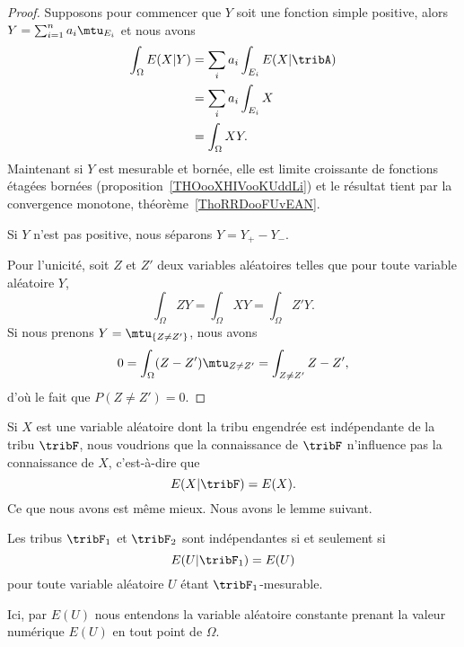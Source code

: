 \begin{proof}
	Supposons pour commencer que \( Y\) soit une fonction simple positive, alors \( Y=\sum_{i=1}^na_i\mtu_{E_i}\) et nous avons
	\begin{subequations}
		\begin{align}
			\int_{\Omega}E(X|Y) & =\sum_{i}a_i\int_{E_i}E(X|\tribA) \\
			                    & =\sum_ia_i\int_{E_i}X             \\
			                    & =\int_{\Omega}XY.
		\end{align}
	\end{subequations}
	Maintenant si \( Y\) est mesurable et bornée, elle est limite croissante de fonctions étagées bornées (proposition~\ref{THOooXHIVooKUddLi}) et le résultat tient par la convergence monotone, théorème~\ref{ThoRRDooFUvEAN}.

	Si \( Y\) n'est pas positive, nous séparons \( Y=Y_+-Y_-\).

	Pour l'unicité, soit \( Z\) et \( Z'\) deux variables aléatoires telles que pour toute variable aléatoire \( Y\),
	\begin{equation}
		\int_{\Omega}ZY=\int_{\Omega}XY=\int_{\Omega}Z'Y.
	\end{equation}
	Si nous prenons \( Y=\mtu_{\{ Z\neq Z' \}}\), nous avons
	\begin{equation}
		0=\int_{\Omega}(Z-Z')\mtu_{Z\neq Z'}=\int_{Z\neq Z'}Z-Z',
	\end{equation}
	d'où le fait que \( P(Z\neq Z')=0\).
\end{proof}

Si \( X\) est une variable aléatoire dont la tribu engendrée est indépendante de la tribu \( \tribF\), nous voudrions que la connaissance de \( \tribF\) n'influence pas la connaissance de \( X\), c'est-à-dire que
\begin{equation}
	E(X|\tribF)=E(X).
\end{equation}
Ce que nous avons est même mieux. Nous avons le lemme suivant.
\begin{lemma}     \label{LemxUZFPV}
	Les tribus \( \tribF_1\) et \( \tribF_2\) sont indépendantes si et seulement si
	\begin{equation}
		E(U|\tribF_1)=E(U)
	\end{equation}
	pour toute variable aléatoire \( U\) étant \( \tribF_1\)-mesurable.
\end{lemma}
Ici, par \( E(U)\) nous entendons la variable aléatoire constante prenant la valeur numérique \( E(U)\) en tout point de \( \Omega\).

